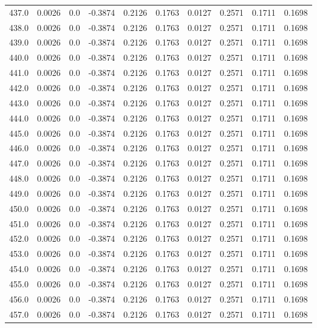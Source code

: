 \begin{longtable}{lrrrrrrrrr}
437.0 & 0.0026 & 0.0 & -0.3874 & 0.2126 & 0.1763 & 0.0127 & 0.2571 & 0.1711 & 0.1698 \\
438.0 & 0.0026 & 0.0 & -0.3874 & 0.2126 & 0.1763 & 0.0127 & 0.2571 & 0.1711 & 0.1698 \\
439.0 & 0.0026 & 0.0 & -0.3874 & 0.2126 & 0.1763 & 0.0127 & 0.2571 & 0.1711 & 0.1698 \\
440.0 & 0.0026 & 0.0 & -0.3874 & 0.2126 & 0.1763 & 0.0127 & 0.2571 & 0.1711 & 0.1698 \\
441.0 & 0.0026 & 0.0 & -0.3874 & 0.2126 & 0.1763 & 0.0127 & 0.2571 & 0.1711 & 0.1698 \\
442.0 & 0.0026 & 0.0 & -0.3874 & 0.2126 & 0.1763 & 0.0127 & 0.2571 & 0.1711 & 0.1698 \\
443.0 & 0.0026 & 0.0 & -0.3874 & 0.2126 & 0.1763 & 0.0127 & 0.2571 & 0.1711 & 0.1698 \\
444.0 & 0.0026 & 0.0 & -0.3874 & 0.2126 & 0.1763 & 0.0127 & 0.2571 & 0.1711 & 0.1698 \\
445.0 & 0.0026 & 0.0 & -0.3874 & 0.2126 & 0.1763 & 0.0127 & 0.2571 & 0.1711 & 0.1698 \\
446.0 & 0.0026 & 0.0 & -0.3874 & 0.2126 & 0.1763 & 0.0127 & 0.2571 & 0.1711 & 0.1698 \\
447.0 & 0.0026 & 0.0 & -0.3874 & 0.2126 & 0.1763 & 0.0127 & 0.2571 & 0.1711 & 0.1698 \\
448.0 & 0.0026 & 0.0 & -0.3874 & 0.2126 & 0.1763 & 0.0127 & 0.2571 & 0.1711 & 0.1698 \\
449.0 & 0.0026 & 0.0 & -0.3874 & 0.2126 & 0.1763 & 0.0127 & 0.2571 & 0.1711 & 0.1698 \\
450.0 & 0.0026 & 0.0 & -0.3874 & 0.2126 & 0.1763 & 0.0127 & 0.2571 & 0.1711 & 0.1698 \\
451.0 & 0.0026 & 0.0 & -0.3874 & 0.2126 & 0.1763 & 0.0127 & 0.2571 & 0.1711 & 0.1698 \\
452.0 & 0.0026 & 0.0 & -0.3874 & 0.2126 & 0.1763 & 0.0127 & 0.2571 & 0.1711 & 0.1698 \\
453.0 & 0.0026 & 0.0 & -0.3874 & 0.2126 & 0.1763 & 0.0127 & 0.2571 & 0.1711 & 0.1698 \\
454.0 & 0.0026 & 0.0 & -0.3874 & 0.2126 & 0.1763 & 0.0127 & 0.2571 & 0.1711 & 0.1698 \\
455.0 & 0.0026 & 0.0 & -0.3874 & 0.2126 & 0.1763 & 0.0127 & 0.2571 & 0.1711 & 0.1698 \\
456.0 & 0.0026 & 0.0 & -0.3874 & 0.2126 & 0.1763 & 0.0127 & 0.2571 & 0.1711 & 0.1698 \\
457.0 & 0.0026 & 0.0 & -0.3874 & 0.2126 & 0.1763 & 0.0127 & 0.2571 & 0.1711 & 0.1698 \\

\end{longtable}
